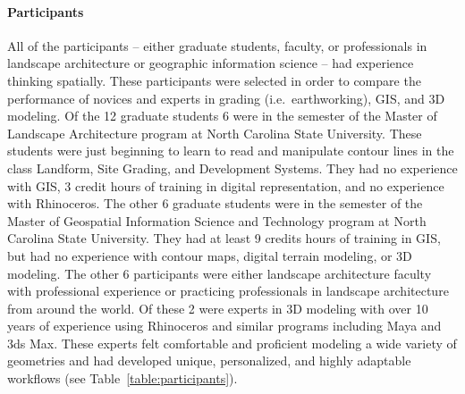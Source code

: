 \documentclass[prodmode,acmtochi]{acmsmall} %
\begin{document}

\paragraph{Participants}
All of the participants 
-- either graduate students, faculty, or professionals 
in landscape architecture or geographic information science -- 
had experience thinking spatially. 
These participants were selected in order to compare 
the performance of novices and experts
in grading (i.e.~earthworking), GIS, and 3D modeling.
Of the 12 graduate students 6 were in the  semester of the 
Master of Landscape Architecture program 
at North Carolina State University.
These students were just beginning to learn to read and manipulate contour lines 
in the class Landform, Site Grading, and Development Systems. 
They had no experience with GIS, 3 credit hours of training in digital representation, 
and no experience with Rhinoceros.
The other 6 graduate students were in the  semester of the 
Master of Geospatial Information Science and Technology program 
at North Carolina State University.
They had at least 9 credits hours of training in GIS, but 
had no experience with contour maps, digital terrain modeling, or 3D modeling.
The other 6 participants were either landscape architecture faculty 
with professional experience or practicing professionals in landscape architecture 
from around the world. 
Of these 2 were experts in 3D modeling with over 10 years of experience 
using Rhinoceros and similar programs including Maya and 3ds Max. 
These experts felt comfortable and proficient modeling a wide variety of geometries 
and had developed unique, personalized, and highly adaptable workflows 
(see Table~\ref{table:participants}).
\end{document}
